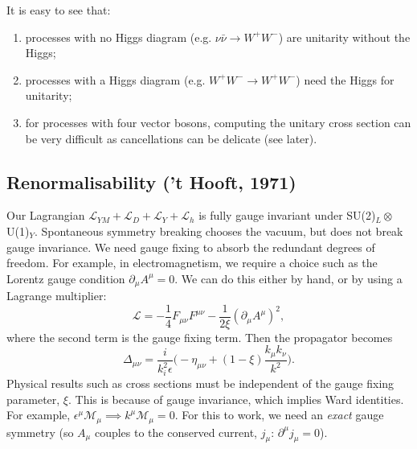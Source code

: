 It is easy to see that:
\begin{enumerate}
\item processes with no Higgs diagram (e.g. $\nu\bar{\nu} \to W^+ W^-$) are unitarity without the Higgs;
\item processes with a Higgs diagram (e.g. $W^+W^- \to W^+W^-$) need the Higgs for unitarity;
\item for processes with four vector bosons, computing the unitary cross section can be very difficult as cancellations can be delicate (see later).
\end{enumerate}
%
\subsection{Renormalisability ('t Hooft, 1971)}
% 
Our Lagrangian $\mathcal{L}_{YM} + \mathcal{L}_D + \mathcal{L}_Y + \mathcal{L}_h$ is fully gauge invariant under SU(2)$_L \otimes$U(1)$_Y$. Spontaneous symmetry breaking chooses the vacuum, but does not break gauge invariance. We need gauge fixing to absorb the redundant degrees of freedom. For example, in electromagnetism, we require a choice such as the Lorentz gauge condition $\partial_\mu A^\mu = 0$. We can do this either by hand, or by using a Lagrange multiplier:
\begin{equation}
\mathcal{L} = - \frac{1}{4}F_{\mu \nu}F^{\mu \nu} - \frac{1}{2\xi}({\partial_\mu A^\mu})^2,
\end{equation}
where the second term is the gauge fixing term. Then the propagator becomes
\begin{equation}
\Delta_{\mu \nu} = \frac{i}{k^2 _ i\epsilon}\bigg(-\eta_{\mu \nu} + (1-\xi)\frac{k_\mu k_\nu}{k^2} \bigg).
\end{equation}
Physical results such as cross sections must be independent of the gauge fixing parameter, $\xi$. This is because of gauge invariance, which implies Ward identities. For example, $\epsilon^\mu \mathcal{M}_\mu \implies k^\mu \mathcal{M}_\mu = 0$. For this to work, we need an \textit{exact} gauge symmetry (so $A_\mu$ couples to the conserved current, $j_\mu$: $\partial^\mu j_\mu =0$).

